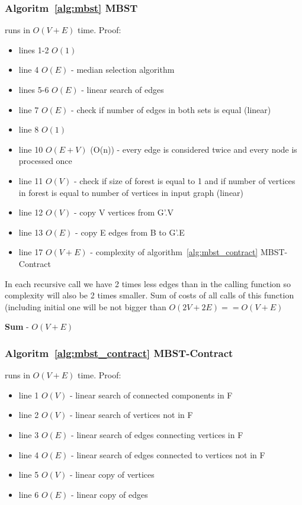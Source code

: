 \documentclass[runningheads, a4paper]{llncs}
\begin{document}
\subsubsection{Algoritm~\ref{alg:mbst} MBST}
runs in $O(V+E)$ time. Proof:

\begin{itemize}
  \item lines 1-2 $O(1)$ 
  \item line 4 $O(E)$ - median selection algorithm \cite{cormen_9}
  \item lines 5-6 $O(E)$ - linear search of edges
  \item line 7 $O(E)$ - check if number of edges  in both sets is equal (linear)
  \item line 8 $O(1)$
  \item line 10 $O(E+V)$ (O(n)) - every edge is considered twice and every node is processed once
  \item line 11 $O(V)$ - check if size of forest is equal to 1 and if number of vertices in forest is equal to number of vertices in input graph (linear)
  \item line 12 $O(V)$ - copy V vertices from G'.V
  \item line 13 $O(E)$ - copy E edges from B to G'.E
  \item line 17 $O(V+E)$ - complexity of algorithm~\ref{alg:mbst_contract} MBST-Contract
\end{itemize}

In each recursive call we have 2 times less edges than in the calling function so complexity will also be 2 times smaller. Sum of costs of all calls of this function (including initial one will be not bigger than $O(2V + 2E) == O(V+E)$

\textbf{Sum} - $O(V + E)$
\subsubsection{Algoritm~\ref{alg:mbst_contract} MBST-Contract}
runs in $O(V+E)$ time. Proof:

\begin{itemize}
    \item line 1 $O(V)$ - linear search of connected components in F
    \item line 2 $O(V)$ - linear search of vertices not in F
    \item line 3 $O(E)$ - linear search of edges connecting vertices in F
    \item line 4 $O(E)$ - linear search of edges connected to vertices not in F
    \item line 5 $O(V)$ - linear copy of vertices
    \item line 6 $O(E)$ - linear copy of edges
\end{itemize}
\end{document}
